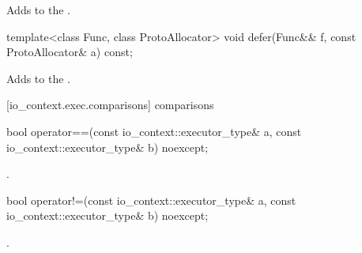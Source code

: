 \begin{itemdescr}
\pnum
\effects Adds  to the .
\end{itemdescr}

%
\begin{itemdecl}
template<class Func, class ProtoAllocator>
  void defer(Func&& f, const ProtoAllocator& a) const;
\end{itemdecl}

\begin{itemdescr}
\pnum
\effects Adds  to the .
\end{itemdescr}



[io_context.exec.comparisons]{ comparisons}

%
\begin{itemdecl}
bool operator==(const io_context::executor_type& a,
                const io_context::executor_type& b) noexcept;
\end{itemdecl}

\begin{itemdescr}
\pnum
\returns {}.
\end{itemdescr}

%
\begin{itemdecl}
bool operator!=(const io_context::executor_type& a,
                const io_context::executor_type& b) noexcept;
\end{itemdecl}

\begin{itemdescr}
\pnum
\returns {}.
\end{itemdescr}




